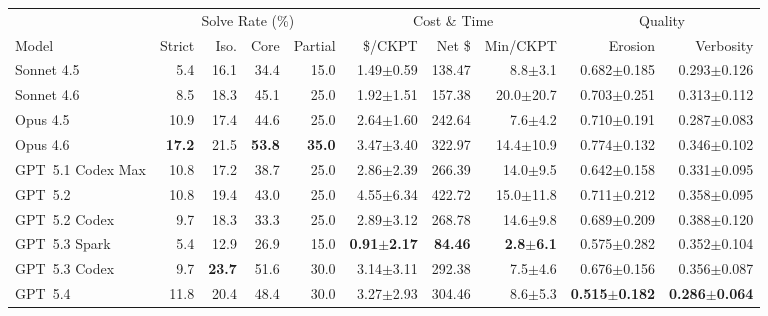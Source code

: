 \begin{table}[t]
\centering
\small
\setlength{\tabcolsep}{4pt}
\begin{tabular}{l | rrrr | rrr | rr}
\toprule
 & \multicolumn{4}{c|}{Solve Rate (\%)}
 & \multicolumn{3}{c|}{Cost \& Time}
 & \multicolumn{2}{c}{Quality} \\
\cmidrule(lr){2-5} \cmidrule(lr){6-8} \cmidrule(l){9-10}
Model & Strict & Iso. & Core & Partial & \$/CKPT & Net \$ & Min/CKPT & Erosion & Verbosity \\
\midrule
Sonnet 4.5 & 5.4 & 16.1 & 34.4 & 15.0 & 1.49{\scriptsize$\pm$0.59} & 138.47 & 8.8{\scriptsize$\pm$3.1} & 0.682{\scriptsize$\pm$0.185} & 0.293{\scriptsize$\pm$0.126} \\
Sonnet 4.6 & 8.5 & 18.3 & 45.1 & 25.0 & 1.92{\scriptsize$\pm$1.51} & 157.38 & 20.0{\scriptsize$\pm$20.7} & 0.703{\scriptsize$\pm$0.251} & 0.313{\scriptsize$\pm$0.112} \\
Opus 4.5 & 10.9 & 17.4 & 44.6 & 25.0 & 2.64{\scriptsize$\pm$1.60} & 242.64 & 7.6{\scriptsize$\pm$4.2} & 0.710{\scriptsize$\pm$0.191} & 0.287{\scriptsize$\pm$0.083} \\
Opus 4.6 & \textbf{17.2} & 21.5 & \textbf{53.8} & \textbf{35.0} & 3.47{\scriptsize$\pm$3.40} & 322.97 & 14.4{\scriptsize$\pm$10.9} & 0.774{\scriptsize$\pm$0.132} & 0.346{\scriptsize$\pm$0.102} \\
\midrule
GPT~5.1 Codex Max & 10.8 & 17.2 & 38.7 & 25.0 & 2.86{\scriptsize$\pm$2.39} & 266.39 & 14.0{\scriptsize$\pm$9.5} & 0.642{\scriptsize$\pm$0.158} & 0.331{\scriptsize$\pm$0.095} \\
GPT~5.2 & 10.8 & 19.4 & 43.0 & 25.0 & 4.55{\scriptsize$\pm$6.34} & 422.72 & 15.0{\scriptsize$\pm$11.8} & 0.711{\scriptsize$\pm$0.212} & 0.358{\scriptsize$\pm$0.095} \\
GPT~5.2 Codex & 9.7 & 18.3 & 33.3 & 25.0 & 2.89{\scriptsize$\pm$3.12} & 268.78 & 14.6{\scriptsize$\pm$9.8} & 0.689{\scriptsize$\pm$0.209} & 0.388{\scriptsize$\pm$0.120} \\
GPT~5.3 Spark & 5.4 & 12.9 & 26.9 & 15.0 & \textbf{0.91{\scriptsize$\pm$2.17}} & \textbf{84.46} & \textbf{2.8{\scriptsize$\pm$6.1}} & 0.575{\scriptsize$\pm$0.282} & 0.352{\scriptsize$\pm$0.104} \\
GPT~5.3 Codex & 9.7 & \textbf{23.7} & 51.6 & 30.0 & 3.14{\scriptsize$\pm$3.11} & 292.38 & 7.5{\scriptsize$\pm$4.6} & 0.676{\scriptsize$\pm$0.156} & 0.356{\scriptsize$\pm$0.087} \\
GPT~5.4 & 11.8 & 20.4 & 48.4 & 30.0 & 3.27{\scriptsize$\pm$2.93} & 304.46 & 8.6{\scriptsize$\pm$5.3} & \textbf{0.515{\scriptsize$\pm$0.182}} & \textbf{0.286{\scriptsize$\pm$0.064}} \\

\end{tabular}
\end{table}
